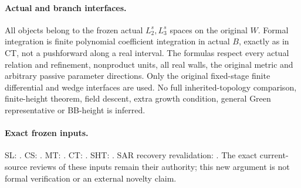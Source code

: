 \paragraph{Actual and branch interfaces.}
All objects belong to the frozen actual $L_2^s,L_3^s$ spaces on
the original $W$.  Formal integration is finite polynomial
coefficient integration in actual $B$, exactly as in CT, not a
pushforward along a real interval.  The formulas respect every
actual relation and refinement, nonproduct units, all real walls,
the original metric and arbitrary passive parameter directions.
Only the original fixed-stage finite differential and wedge
interfaces are used.  No full inherited-topology comparison,
finite-height theorem, field descent, extra growth condition,
general Green representative or BB-height is inferred.

\paragraph{Exact frozen inputs.}
SL: .
CS: .
MT: .
CT: .
SHT: .
SAR recovery revalidation:
.
The exact current-source reviews of these inputs remain their
authority; this new argument is not formal verification or an
external novelty claim.
